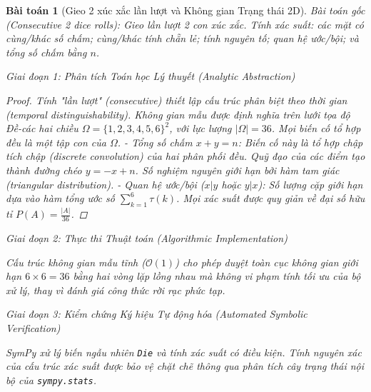 \documentclass{article}
\newtheorem{baitoan}{Bài toán}
\begin{document}

\begin{baitoan}[Gieo 2 xúc xắc lần lượt và Không gian Trạng thái 2D]
 \emph{Bài toán gốc (Consecutive 2 dice rolls):} 
 Gieo lần lượt 2 con xúc xắc. Tính xác suất: các mặt có cùng/khác số chấm; cùng/khác tính chẵn lẻ; tính nguyên tố; quan hệ ước/bội; và tổng số chấm bằng $n$.

\vspace{0.5em}\noindent\emph{Giai đoạn 1: Phân tích Toán học Lý thuyết (Analytic Abstraction)}
 
 \begin{proof}
 Tính "lần lượt" (consecutive) thiết lập cấu trúc phân biệt theo thời gian (temporal distinguishability). Không gian mẫu được định nghĩa trên lưới tọa độ Đề-các hai chiều $\Omega = \{1, 2, 3, 4, 5, 6\}^2$, với lực lượng $|\Omega| = 36$. Mọi biến cố tổ hợp đều là một tập con của $\Omega$.
 - Tổng số chấm $x+y = n$: Biến cố này là tổ hợp chập tích chập (discrete convolution) của hai phân phối đều. Quỹ đạo của các điểm tạo thành đường chéo $y = -x + n$. Số nghiệm nguyên giới hạn bởi hàm tam giác (triangular distribution).
 - Quan hệ ước/bội ($x|y$ hoặc $y|x$): Số lượng cặp giới hạn dựa vào hàm tổng ước số $\sum_{k=1}^6 \tau(k)$.
 Mọi xác suất được quy giản về đại số hữu tỉ $P(A) = \frac{|A|}{36}$.
 \end{proof}

\vspace{0.5em}\noindent\emph{Giai đoạn 2: Thực thi Thuật toán (Algorithmic Implementation)}
 
 Cấu trúc không gian mẫu tĩnh ($\mathcal{O}(1)$) cho phép duyệt toàn cục không gian giới hạn $6 \times 6 = 36$ bằng hai vòng lặp lồng nhau mà không vi phạm tính tối ưu của bộ xử lý, thay vì đánh giá công thức rời rạc phức tạp.



\vspace{0.5em}\noindent\emph{Giai đoạn 3: Kiểm chứng Ký hiệu Tự động hóa (Automated Symbolic Verification)}
 
 \textsf{SymPy} xử lý biến ngẫu nhiên \texttt{Die} và tính xác suất có điều kiện. Tính nguyên xác của cấu trúc xác suất được bảo vệ chặt chẽ thông qua phân tích cây trạng thái nội bộ của \texttt{sympy.stats}.




\end{baitoan}
\end{document}
